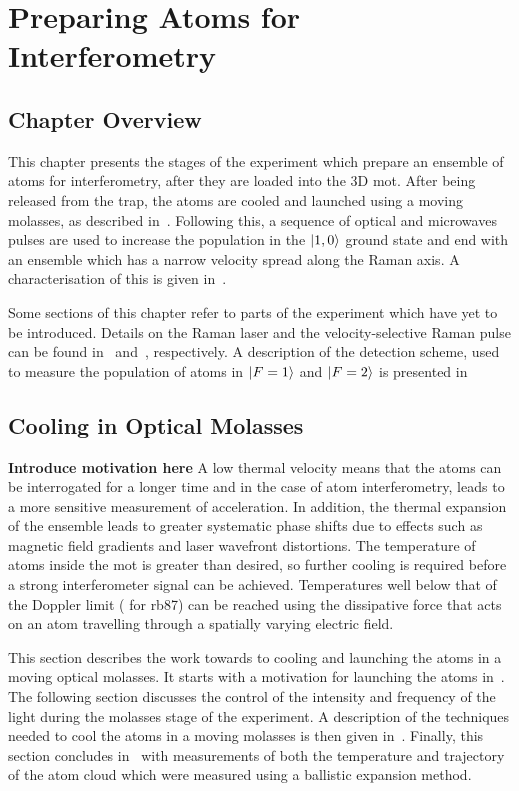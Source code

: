 \chapter{Preparing Atoms for Interferometry}\label{chap:atom_prep}
\section{Chapter Overview}
This chapter presents the stages of the experiment which prepare an ensemble of atoms for interferometry, after they are loaded into the 3D \ac{mot}. After being released from the trap, the atoms are cooled and launched using a moving molasses, as described in~. Following this, a sequence of optical and microwaves pulses are used to increase the population in the \(\ket{1,0}\) ground state and end with an ensemble which has a narrow velocity spread along the Raman axis. A characterisation of this is given in~.
\par\noindent
Some sections of this chapter refer to parts of the experiment which have yet to be introduced. Details on the Raman laser and the velocity-selective Raman pulse can be found in~ and~, respectively. A description of the detection scheme, used to measure the population of atoms in \(\ket{F=1}\) and \(\ket{F=2}\) is presented in~


\section{Cooling in Optical Molasses}\label{sec:optical_molasses}
{\textbf{Introduce motivation here}}
A low thermal velocity means that the atoms can be interrogated for a longer time and in the case of atom interferometry, leads to a more sensitive measurement of acceleration. In addition, the thermal expansion of the ensemble leads to greater systematic phase shifts due to effects such as magnetic field gradients and laser wavefront distortions. The temperature of atoms inside the \ac{mot} is greater than desired, so further cooling is required before a strong interferometer signal can be achieved. Temperatures well below that of the Doppler limit ( for \ac{rb87}) can be reached using the dissipative force that acts on an atom travelling through a spatially varying electric field. 

\par\noindent
This section describes the work towards to cooling and launching the atoms in a moving optical molasses. It starts with a motivation for launching the atoms in~. The following section discusses the control of the intensity and frequency of the light during the molasses stage of the experiment. A description of the techniques needed to cool the atoms in a moving molasses is then given in~. Finally, this section concludes in~ with measurements of both the temperature and trajectory of the atom cloud which were measured using a ballistic expansion method.


